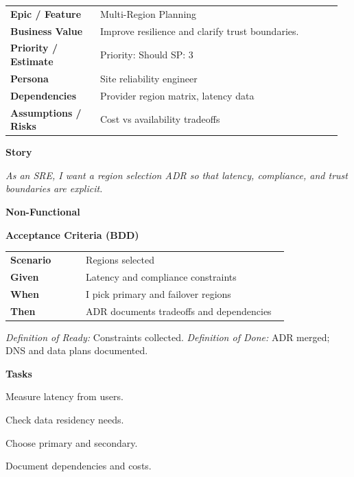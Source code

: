 \documentclass[11pt,letterpaper]{article}
\makeatletter
\newenvironment{kvtable}{%
  \par\noindent\begin{tabular}{@{}>{\raggedright\bfseries\arraybackslash}p{0.26\linewidth} >{\raggedright\arraybackslash}p{0.70\linewidth}@{}}
}{\end{tabular}\par}
\newenvironment{bdd}{%
  \par\noindent\begin{tabular}{@{}>{\raggedright\bfseries\arraybackslash}p{0.26\linewidth} >{\raggedright\arraybackslash}p{0.70\linewidth}@{}}
}{\end{tabular}\par}
\newcommand{\DoRDoD}[2]{%
  \vspace{0.35em}
  {\footnotesize\color{Muted}%
    \textit{Definition of Ready:} #1 \; \textbullet\;
    \textit{Definition of Done:} #2%
  }%
}
\newenvironment{storycard}[2]{%
  \begin{tcolorbox}[cloudcard, title={#1 --- #2}]%
}{\end{tcolorbox}}
\newcommand{\sectionlabel}[1]{\par\vspace{0.35em}\textbf{#1}\par}
\makeatother
\begin{document}
\begin{storycard}{CCS-29}{Ch. 29 — Regions, Zones, \& Trust Boundaries}
\begin{kvtable}
Epic / Feature & Multi-Region Planning\\
Business Value & Improve resilience and clarify trust boundaries.\\
Priority / Estimate & Priority: Should \quad SP: 3\\
Persona & Site reliability engineer\\
Dependencies & Provider region matrix, latency data\\
Assumptions / Risks & Cost vs availability tradeoffs\\
\end{kvtable}
\sectionlabel{Story}
\textit{As an SRE, I want a region selection ADR so that latency, compliance, and trust boundaries are explicit.}
\sectionlabel{Non-Functional}\;
\sectionlabel{Acceptance Criteria (BDD)}
\begin{bdd}
Scenario & Regions selected\\
Given & Latency and compliance constraints\\
When & I pick primary and failover regions\\
Then & ADR documents tradeoffs and dependencies\\
\end{bdd}
\DoRDoD{Constraints collected.}{ADR merged; DNS and data plans documented.}
\sectionlabel{Tasks}
\begin{checklist}
\item Measure latency from users.
\item Check data residency needs.
\item Choose primary and secondary.
\item Document dependencies and costs.
\end{checklist}
\end{storycard}
\end{document}
